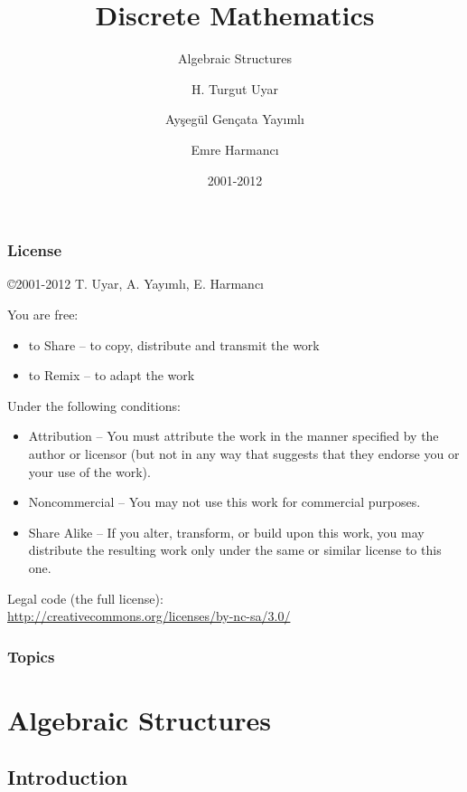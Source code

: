 \documentclass[dvipsnames]{beamer}
\title{Discrete Mathematics}
\subtitle{Algebraic Structures}
\author{H. Turgut Uyar \and Ayşegül Gençata Yayımlı \and Emre Harmancı}
\date{2001-2012}
\begin{document}
\begin{frame}
  \titlepage
\end{frame}

\begin{frame}
  \frametitle{License}

  \hfill
  \copyright 2001-2012 T. Uyar, A. Yayımlı, E. Harmancı

  \vfill
  \begin{tiny}
    You are free:
    \begin{itemize}
      \item to Share -- to copy, distribute and transmit the work
      \item to Remix -- to adapt the work
    \end{itemize}

    Under the following conditions:
    \begin{itemize}
      \item Attribution -- You must attribute the work in the manner specified by
        the author or licensor (but not in any way that suggests that they
        endorse you or your use of the work).

      \item Noncommercial -- You may not use this work for commercial purposes.

      \item Share Alike -- If you alter, transform, or build upon this work, you
        may distribute the resulting work only under the same or similar license
        to this one.
    \end{itemize}
  \end{tiny}

  \vfill
  Legal code (the full license):\\
  \url{http://creativecommons.org/licenses/by-nc-sa/3.0/}
\end{frame}

\begin{frame}
  \frametitle{Topics}
  \tableofcontents
\end{frame}

\section{Algebraic Structures}

\subsection{Introduction}
\end{document}
